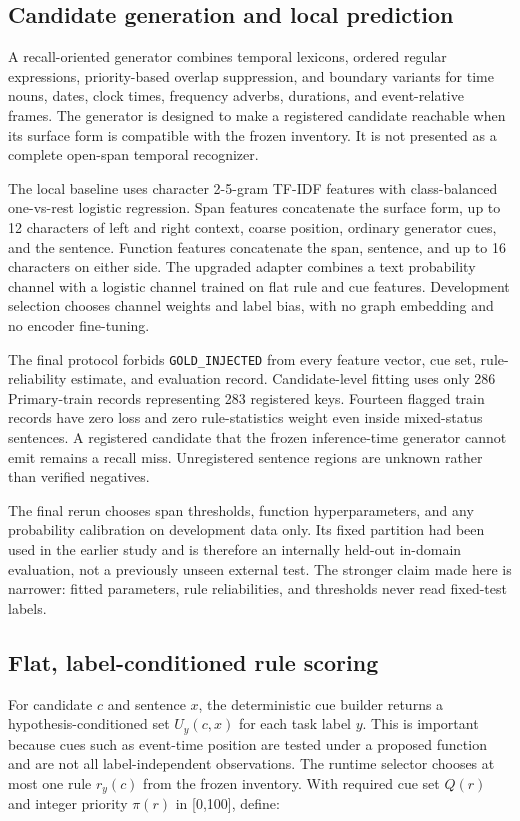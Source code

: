 \documentclass{CUP-JNL-NLP}
\begin{document}
\subsection{Candidate generation and local prediction}
A recall-oriented generator combines temporal lexicons, ordered regular expressions, priority-based overlap suppression, and boundary variants for time nouns, dates, clock times, frequency adverbs, durations, and event-relative frames. The generator is designed to make a registered candidate reachable when its surface form is compatible with the frozen inventory. It is not presented as a complete open-span temporal recognizer.

The local baseline uses character 2-5-gram TF-IDF features with class-balanced one-vs-rest logistic regression. Span features concatenate the surface form, up to 12 characters of left and right context, coarse position, ordinary generator cues, and the sentence. Function features concatenate the span, sentence, and up to 16 characters on either side. The upgraded adapter combines a text probability channel with a logistic channel trained on flat rule and cue features. Development selection chooses channel weights and label bias, with no graph embedding and no encoder fine-tuning.

The final protocol forbids \texttt{GOLD\_INJECTED} from every feature vector, cue set, rule-reliability estimate, and evaluation record. Candidate-level fitting uses only 286 Primary-train records representing 283 registered keys. Fourteen flagged train records have zero loss and zero rule-statistics weight even inside mixed-status sentences. A registered candidate that the frozen inference-time generator cannot emit remains a recall miss. Unregistered sentence regions are unknown rather than verified negatives.

The final rerun chooses span thresholds, function hyperparameters, and any probability calibration on development data only. Its fixed partition had been used in the earlier study and is therefore an internally held-out in-domain evaluation, not a previously unseen external test. The stronger claim made here is narrower: fitted parameters, rule reliabilities, and thresholds never read fixed-test labels.

\subsection{Flat, label-conditioned rule scoring}
For candidate $c$ and sentence $x$, the deterministic cue builder returns a hypothesis-conditioned set $U_y(c,x)$ for each task label $y$. This is important because cues such as event-time position are tested under a proposed function and are not all label-independent observations. The runtime selector chooses at most one rule $r_y(c)$ from the frozen inventory. With required cue set $Q(r)$ and integer priority $\pi(r)$ in [0,100], define:
\end{document}
